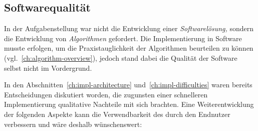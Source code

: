 \documentclass[../main/thesis.tex]{subfiles}
\begin{document}
\subsection{Softwarequalität}

In der Aufgabenstellung war nicht die Entwicklung einer \emph{Softwarelösung,} sondern die Entwicklung von \emph{Algorithmen} gefordert.
Die Implementierung in Software musste erfolgen, um die Praxistauglichkeit der Algorithmen beurteilen zu können (vgl.~\ref{ch:algorithm-overview}), jedoch stand dabei die Qualität der Software selbst nicht im Vordergrund.

In den Abschnitten~\ref{ch:impl-architecture} und~\ref{ch:impl-difficulties} waren bereits Entscheidungen diskutiert worden, die zugunsten einer schnelleren Implementierung qualitative Nachteile mit sich brachten.
Eine Weiterentwicklung der folgenden Aspekte kann die Verwendbarkeit des  durch den Endnutzer verbessern und wäre deshalb wünschenswert:
%
\end{document}
